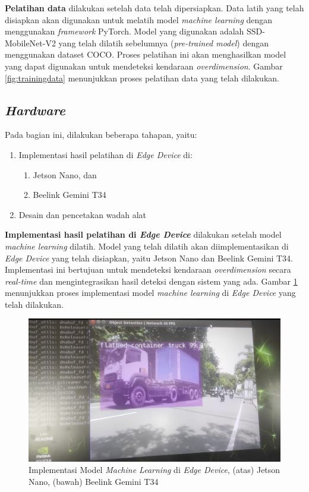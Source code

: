 \textbf{Pelatihan data} dilakukan setelah data telah dipersiapkan. Data latih yang telah disiapkan akan digunakan untuk melatih model \emph{machine learning} dengan menggunakan \emph{framework} PyTorch. Model yang digunakan adalah SSD-MobileNet-V2 yang telah dilatih sebelumnya (\emph{pre-trained model}) dengan menggunakan dataset COCO. Proses pelatihan ini akan menghasilkan model yang dapat digunakan untuk mendeteksi kendaraan \emph{overdimension}. Gambar \ref{fig:trainingdata} menunjukkan proses pelatihan data yang telah dilakukan.

\subsection{\emph{Hardware}}

Pada bagian ini, dilakukan beberapa tahapan, yaitu:
\begin{enumerate}[nolistsep]
  \item Implementasi hasil pelatihan di \emph{Edge Device} di:
  \begin{enumerate}[nolistsep]
    \item Jetson Nano, dan
    \item Beelink Gemini T34
  \end{enumerate} 
  \item Desain dan pencetakan wadah alat
\end{enumerate}

\textbf{Implementasi hasil pelatihan di \emph{Edge Device}} dilakukan setelah model \emph{machine learning} dilatih. Model yang telah dilatih akan diimplementasikan di \emph{Edge Device} yang telah disiapkan, yaitu Jetson Nano dan Beelink Gemini T34. Implementasi ini bertujuan untuk mendeteksi kendaraan \emph{overdimension} secara \emph{real-time} dan mengintegrasikan hasil deteksi dengan sistem yang ada. Gambar \ref{fig:implementationedgedevice} menunjukkan proses implementasi model \emph{machine learning} di \emph{Edge Device} yang telah dilakukan.

\begin{figure}
  \centering

  \includegraphics[scale=0.4]{gambar/bab3-implementasi-di-jetson.jpeg}

  \caption{\centering Implementasi Model \emph{Machine Learning} di \emph{Edge Device}, (atas) Jetson Nano, (bawah) Beelink Gemini T34}
  \label{fig:implementationedgedevice}
\end{figure}

